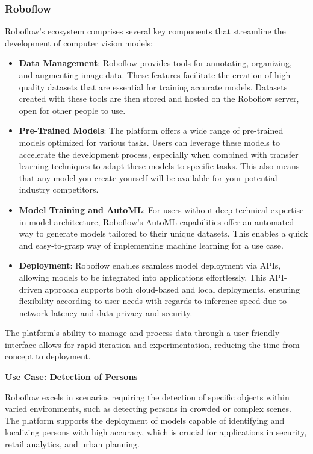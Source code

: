 \subsubsection{Roboflow}
Roboflow's ecosystem comprises several key components that streamline the development of computer vision models:
\begin{itemize}
    \item \textbf{Data Management}: Roboflow provides tools for annotating, organizing, and augmenting image data. These features facilitate the creation of high-quality datasets that are essential for training accurate models. Datasets created with these tools are then stored and hosted on the Roboflow server, open for other people to use.
    \item \textbf{Pre-Trained Models}: The platform offers a wide range of pre-trained models optimized for various tasks. Users can leverage these models to accelerate the development process, especially when combined with transfer learning techniques to adapt these models to specific tasks. This also means that any model you create yourself will be available for your potential industry competitors.
    \item \textbf{Model Training and AutoML}: For users without deep technical expertise in model architecture, Roboflow's AutoML capabilities offer an automated way to generate models tailored to their unique datasets. This enables a quick and easy-to-grasp way of implementing machine learning for a use case.
    \item \textbf{Deployment}: Roboflow enables seamless model deployment via APIs, allowing models to be integrated into applications effortlessly. This API-driven approach supports both cloud-based and local deployments, ensuring flexibility according to user needs with regards to inference speed due to network latency and data privacy and security.
\end{itemize}

The platform's ability to manage and process data through a user-friendly interface allows for rapid iteration and experimentation, reducing the time from concept to deployment.

\textbf{Use Case: Detection of Persons}

Roboflow excels in scenarios requiring the detection of specific objects within varied environments, such as detecting persons in crowded or complex scenes. The platform supports the deployment of models capable of identifying and localizing persons with high accuracy, which is crucial for applications in security, retail analytics, and urban planning.

